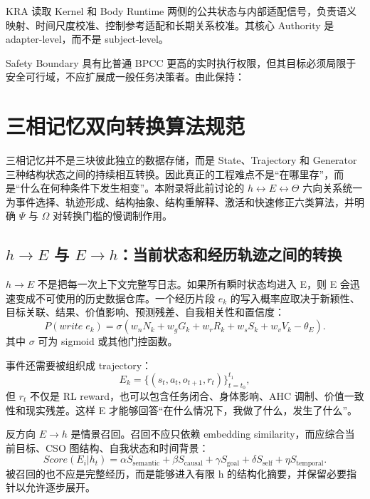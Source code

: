 KRA 读取 Kernel 和 Body Runtime 两侧的公共状态与内部适配信号，负责语义映射、时间尺度校准、控制参考适配和长期关系校准。其核心 Authority 是 adapter-level，而不是 subject-level。

Safety Boundary 具有比普通 BPCC 更高的实时执行权限，但其目标必须局限于安全可行域，不应扩展成一般任务决策者。由此保持：
\begin{statementbox}
\centering
{}
\end{statementbox}


\chapter{三相记忆双向转换算法规范}
\label{app:memory}

\begin{chapterlead}
三相记忆并不是三块彼此独立的数据存储，而是 State、Trajectory 和 Generator 三种结构状态之间的持续相互转换。因此真正的工程难点不是“在哪里存”，而是“什么在何种条件下发生相变”。本附录将此前讨论的 $h\leftrightarrow E\leftrightarrow\Theta$ 六向关系统一为事件选择、轨迹形成、结构抽象、结构重解释、激活和快速修正六类算法，并明确 $\Psi$ 与 $\Omega$ 对转换门槛的慢调制作用。
\end{chapterlead}

\section{$h\rightarrow E$ 与 $E\rightarrow h$：当前状态和经历轨迹之间的转换}

$h\rightarrow E$ 不是把每一次上下文完整写日志。如果所有瞬时状态均进入 E，则 E 会迅速变成不可使用的历史数据仓库。一个经历片段 $e_k$ 的写入概率应取决于新颖性、目标关联、结果、价值影响、预测残差、自我相关性和置信度：
\[
P(write\;e_k)
=
\sigma(
w_nN_k+
w_gG_k+
w_rR_k+
w_sS_k+
w_vV_k
-\theta_E
).
\]
其中 $\sigma$ 可为 sigmoid 或其他门控函数。

事件还需要被组织成 trajectory：
\[
E_k
=
\{(s_t,a_t,o_{t+1},r_t)\}_{t=t_0}^{t_1},
\]
但 $r_t$ 不仅是 RL reward，也可以包含任务闭合、身体影响、AHC 调制、价值一致性和现实残差。这样 E 才能够回答“在什么情况下，我做了什么，发生了什么”。

反方向 $E\rightarrow h$ 是情景召回。召回不应只依赖 embedding similarity，而应综合当前目标、CSO 图结构、自我状态和时间背景：
\[
Score(E_i|h_t)
=
\alpha S_{\mathrm{semantic}}
+
\beta S_{\mathrm{causal}}
+
\gamma S_{\mathrm{goal}}
+
\delta S_{\mathrm{self}}
+
\eta S_{\mathrm{temporal}}.
\]
被召回的也不应是完整经历，而是能够进入有限 h 的结构化摘要，并保留必要指针以允许逐步展开。

